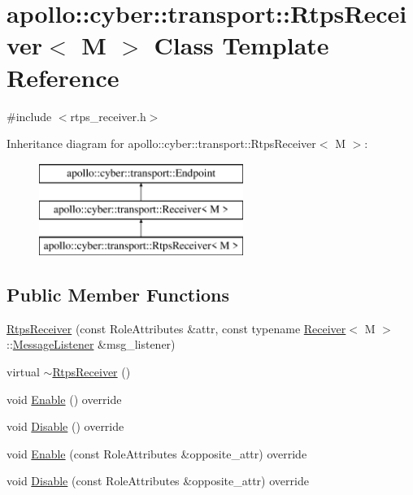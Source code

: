 \hypertarget{classapollo_1_1cyber_1_1transport_1_1RtpsReceiver}{\section{apollo\-:\-:cyber\-:\-:transport\-:\-:Rtps\-Receiver$<$ M $>$ Class Template Reference}
\label{classapollo_1_1cyber_1_1transport_1_1RtpsReceiver}
}


{\ttfamily \#include $<$rtps\-\_\-receiver.\-h$>$}

Inheritance diagram for apollo\-:\-:cyber\-:\-:transport\-:\-:Rtps\-Receiver$<$ M $>$\-:\begin{figure}[H]
\begin{center}
\leavevmode
\includegraphics[height=3.000000cm]{classapollo_1_1cyber_1_1transport_1_1RtpsReceiver}
\end{center}
\end{figure}
\subsection*{Public Member Functions}
\begin{DoxyCompactItemize}
\item 
\hyperlink{classapollo_1_1cyber_1_1transport_1_1RtpsReceiver_a64e8deb7909574005980eee86e317f98}{Rtps\-Receiver} (const Role\-Attributes \&attr, const typename \hyperlink{classapollo_1_1cyber_1_1transport_1_1Receiver}{Receiver}$<$ M $>$\-::\hyperlink{classapollo_1_1cyber_1_1transport_1_1Receiver_abd906fd03582b49acbdc81b48a8974aa}{Message\-Listener} \&msg\-\_\-listener)
\item 
virtual \hyperlink{classapollo_1_1cyber_1_1transport_1_1RtpsReceiver_a146ccd5dcdaed3d5881b1b0acd74d2e8}{$\sim$\-Rtps\-Receiver} ()
\item 
void \hyperlink{classapollo_1_1cyber_1_1transport_1_1RtpsReceiver_a346bfde5e793e1d8a4ae942baaef7fa3}{Enable} () override
\item 
void \hyperlink{classapollo_1_1cyber_1_1transport_1_1RtpsReceiver_ad0ce8b3abcb6e4e2777c645e3b5929bc}{Disable} () override
\item 
void \hyperlink{classapollo_1_1cyber_1_1transport_1_1RtpsReceiver_a852c553030a2881739c0167063797e9f}{Enable} (const Role\-Attributes \&opposite\-\_\-attr) override
\item 
void \hyperlink{classapollo_1_1cyber_1_1transport_1_1RtpsReceiver_ab182b348dc3d857836bde7c5d80772b5}{Disable} (const Role\-Attributes \&opposite\-\_\-attr) override
\end{DoxyCompactItemize}
